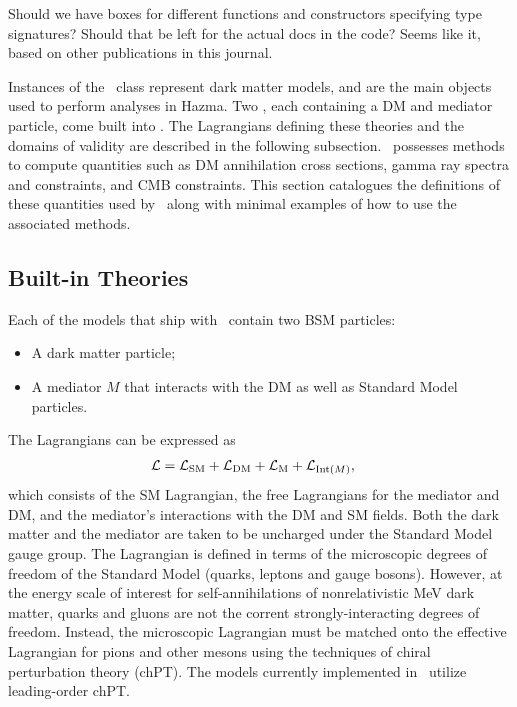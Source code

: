 {\color{red} Should we have boxes for different functions and constructors specifying type signatures? Should that be left for the actual docs in the code? Seems like it, based on other publications in this journal.}

Instances of the \theory\ class represent dark matter models, and are the main objects used to perform analyses in Hazma. Two \theory\s, each containing a DM and mediator particle, come built into \hazma. The Lagrangians defining these theories and the domains of validity are described in the following subsection. \theory\ possesses methods to compute quantities such as DM annihilation cross sections, gamma ray spectra and constraints, and CMB constraints. This section catalogues the definitions of these quantities used by \hazma\ along with minimal examples of how to use the associated methods.

\subsection{Built-in Theories}%
\label{sub:built_in_theories}


Each of the models that ship with \hazma\ contain two BSM particles:
\begin{itemize}
    \item A dark matter particle;
    \item A mediator $M$ that interacts with the DM as well as Standard Model particles.
\end{itemize}
The Lagrangians can be expressed as
\begin{align}
    \mathcal{L} &= \mathcal{L}_{\mathrm{SM}} + \mathcal{L}_{\mathrm{DM}} + \mathcal{L}_{\mathrm{M}} + \mathcal{L}_{{\mathrm{Int}}(M)},
\end{align}
which consists of the SM Lagrangian, the free Lagrangians for the mediator and DM, and the mediator's interactions with the DM and SM fields. Both the dark matter and the mediator are taken to be uncharged under the Standard Model gauge group. The Lagrangian is defined in terms of the microscopic degrees of freedom of the Standard Model (quarks, leptons and gauge bosons). However, at the energy scale of interest for self-annihilations of nonrelativistic MeV dark matter, quarks and gluons are not the corrent strongly-interacting degrees of freedom. Instead, the microscopic Lagrangian must be matched onto the effective Lagrangian for pions and other mesons using the techniques of chiral perturbation theory (chPT). The models currently implemented in \hazma\ utilize leading-order chPT. 

